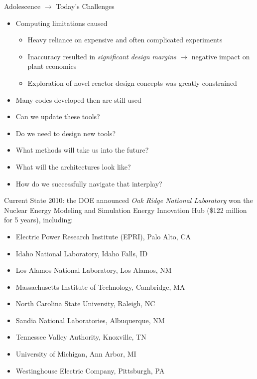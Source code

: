\documentclass[xcolor=x11names,compress]{beamer}
\renewcommand{\(}{\begin{columns}}
\renewcommand{\)}{\end{columns}}
\newcommand{\<}[1]{\begin{column}{#1}}
\renewcommand{\>}{\end{column}}
\begin{document}
\begin{frame}{Adolescence $\rightarrow$ Today's Challenges}
\begin{itemize}
\item Computing limitations caused
\begin{itemize}
\item Heavy reliance on expensive and often complicated experiments
\item Inaccuracy resulted in \emph{significant design margins} $\rightarrow$ negative impact on plant economics
\item Exploration of novel reactor design concepts was greatly constrained 
\end{itemize}
\item Many codes developed then are still used 
\item Can we update these tools?
\item Do we need to design new tools?
\item What methods will take us into the future?
\item What will the architectures look like?
\item How do we successfully navigate that interplay?
\end{itemize}
\end{frame}

\begin{frame}{Current State}
2010: the DOE announced \emph{Oak Ridge National Laboratory} won the Nuclear Energy Modeling and Simulation Energy Innovation Hub (\$122 million for 5 years), including:	
\begin{itemize}
\item Electric Power Research Institute (EPRI), Palo Alto, CA
\item Idaho National Laboratory, Idaho Falls, ID
\item Los Alamos National Laboratory, Los Alamos, NM
\item Massachusetts Institute of Technology, Cambridge, MA
\item North Carolina State University, Raleigh, NC
\item Sandia National Laboratories, Albuquerque, NM
\item Tennessee Valley Authority, Knoxville, TN
\item University of Michigan, Ann Arbor, MI
\item Westinghouse Electric Company, Pittsburgh, PA
\end{itemize}
\end{frame}
\end{document}

